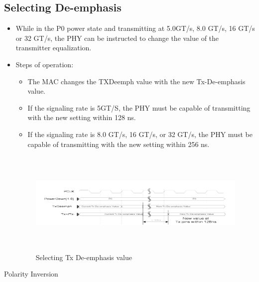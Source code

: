 \subsection{Selecting De-emphasis} 
\begin{itemize}
    \item While in the P0 power state and transmitting at 5.0GT/s, 8.0 GT/s, 16 GT/s or 32 GT/s, the PHY can be instructed to change the value of the transmitter equalization.
\item Steps of operation:
\begin{itemize}
    \item The MAC changes the TXDeemph value with the new Tx-De-emphasis value.

    \item If the signaling rate is 5GT/S, the PHY must be capable of transmitting with the new setting within 128 ns.
    \item If the signaling rate is 8.0 GT/s, 16 GT/s, or 32 GT/s, the PHY must be capable of transmitting with the new setting within 256 ns.

\end{itemize}
\begin{figure}[H]
  \centering
  \includegraphics[width=130mm,height=50mm]{images/clk_diagram/de.png}
  \caption{Selecting Tx De-emphasis value}
  \label{lane}
\end{figure}
\end{itemize}
 Polarity Inversion
